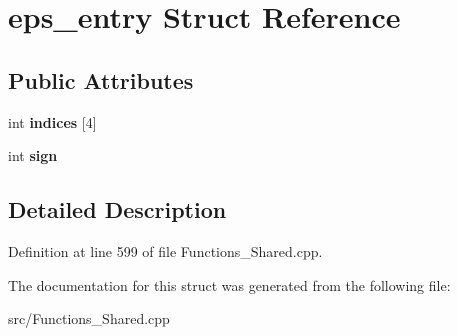 \hypertarget{structeps__entry}{\section{eps\-\_\-entry Struct Reference}
\label{structeps__entry}
}
\subsection*{Public Attributes}
\begin{DoxyCompactItemize}
\item 
\hypertarget{structeps__entry_aeb23818a8c93790dc84e159e22fece7c}{int {\bfseries indices} \mbox{[}4\mbox{]}}\label{structeps__entry_aeb23818a8c93790dc84e159e22fece7c}

\item 
\hypertarget{structeps__entry_a6557cf0ea08b5afe0e6f525e13934712}{int {\bfseries sign}}\label{structeps__entry_a6557cf0ea08b5afe0e6f525e13934712}

\end{DoxyCompactItemize}


\subsection{Detailed Description}


Definition at line 599 of file Functions\-\_\-\-Shared.\-cpp.



The documentation for this struct was generated from the following file\-:\begin{DoxyCompactItemize}
\item 
src/Functions\-\_\-\-Shared.\-cpp\end{DoxyCompactItemize}
